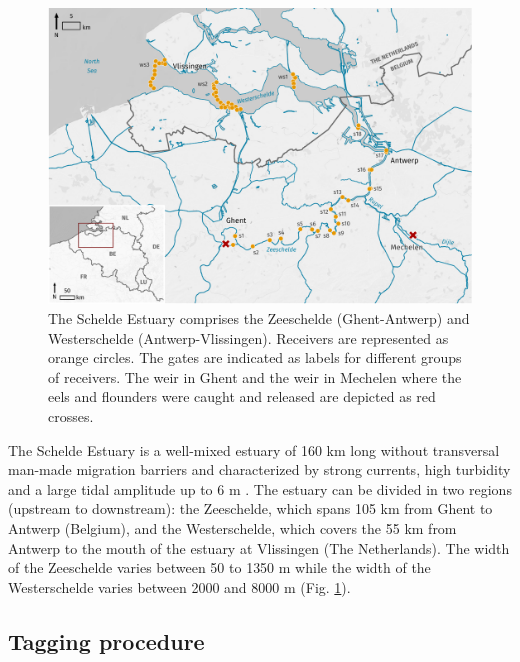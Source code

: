 \documentclass[preprint,12pt,authoryear]{elsarticle}
\begin{document}
\begin{spacing}{1.9}
\begin{figure}[h!]
  \centering
  \includegraphics[scale=0.6]{receivernetwork.pdf}
  \caption{The Schelde Estuary comprises the Zeeschelde (Ghent-Antwerp) and Westerschelde (Antwerp-Vlissingen). Receivers are represented as orange circles. The gates are indicated as labels for different groups of receivers. The weir in Ghent and the weir in Mechelen where the eels and flounders were caught and released are depicted as red crosses. }
  \label{fig:network}
\end{figure}

The Schelde Estuary is a well-mixed estuary of 160 km long without transversal man-made migration barriers and characterized by strong currents, high turbidity and a large tidal amplitude up to 6 m \citep{Cornet2016}. The estuary can be divided in two regions (upstream to downstream): the Zeeschelde, which spans 105 km from Ghent to Antwerp (Belgium), and the Westerschelde, which covers the 55 km from Antwerp to the mouth of the estuary at Vlissingen (The Netherlands). The width of the Zeeschelde varies between 50 to 1350 m while the width of the Westerschelde varies between 2000 and 8000 m (Fig. \ref{fig:network}). 

\subsection{Tagging procedure}


\end{spacing}
\end{document}
